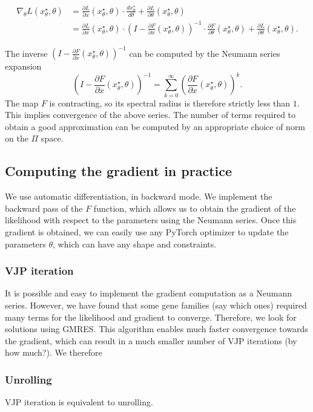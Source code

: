 \documentclass{article}
\newcommand{\1}{\mathbf{1}}
\begin{document}
\begin{align*}
    \nabla_\theta L(x^\star_\theta, \theta)
    &=
    \frac{\partial L}{\partial x}(x^\star_\theta, \theta) \cdot \frac{dx^\star_\theta}{d\theta} + \frac{\partial L}{\partial \theta}(x^\star_\theta, \theta)\\
    &=
    \frac{\partial L}{\partial x}(x^\star_\theta, \theta) \cdot (I - \frac{\partial F}{\partial x}(x^\star_\theta, \theta))^{-1} \cdot \frac{\partial F}{\partial \theta}(x^\star_\theta, \theta) + \frac{\partial L}{\partial \theta}(x^\star_\theta, \theta).
\end{align*}

The inverse $(I - \frac{\partial F}{\partial x}(x^\star_\theta, \theta))^{-1}$ can be computed by the Neumann series expansion
\[
    (I - \frac{\partial F}{\partial x}(x^\star_\theta, \theta))^{-1} = \sum_{k=0}^{\infty} (\frac{\partial F}{\partial x}(x^\star_\theta, \theta))^k.   
\]
The map $F$ is contracting, so its spectral radius is therefore strictly less than $1$. This implies convergence of the above series. The number of terms required to obtain a good approximation can be computed by an appropriate choice of norm on the $\Pi$ space.


\subsection{Computing the gradient in practice}
We use automatic differentiation, in backward mode. We implement the backward pass of the $F$ function, which allows us to obtain the gradient of the likelihood with respect to the parameters using the Neumann series. Once this gradient is obtained, we can easily use any PyTorch optimizer to update the parameters $\theta$, which can have any shape and constraints.
\subsubsection{VJP iteration}
It is possible and easy to implement the gradient computation as a Neumann series. However, we have found that some gene families (say which ones) required many terms for the likelihood and gradient to converge. Therefore, we look for solutions using GMRES. This algorithm enables much faster convergence towards the gradient, which can result in a much smaller number of VJP iterations (by how much?). We therefore
\subsubsection{Unrolling}
VJP iteration is equivalent to unrolling.
\end{document}
